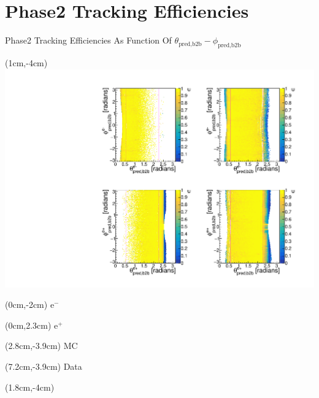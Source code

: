 \documentclass[8pt]{beamer}
\begin{document}
\section{Phase2 Tracking Efficiencies}


\begin{frame}{Phase2 Tracking Efficiencies As Function Of $\theta_{\textrm{pred,b2b}}-\phi_{\textrm{pred,b2b}}$}
	
	
	
	\begin{textblock*}{9cm}(1cm,-4cm)
		\includegraphics[width=\textwidth]{VPlots/P2/xCEffTP_MCData}
	\end{textblock*}
	
	\begin{textblock*}{2cm}(0cm,-2cm)
		$\textrm{e}^-$
	\end{textblock*}
	
	\begin{textblock*}{2cm}(0cm,2.3cm)
		$\textrm{e}^+$
	\end{textblock*}
	
	
	\begin{textblock*}{2cm}(2.8cm,-3.9cm)
		MC
	\end{textblock*}
	
	\begin{textblock*}{2cm}(7.2cm,-3.9cm)
		Data
	\end{textblock*}
	
	
	
	
	\begin{textblock*}{9cm}(1.8cm,-4cm)
	\end{textblock*}
	

\end{frame}
\end{document}
